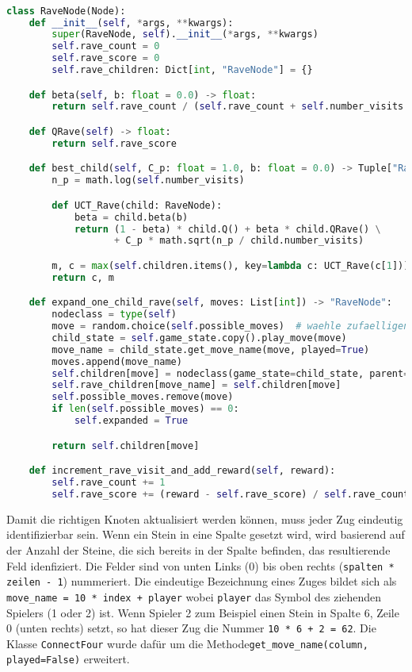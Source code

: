 \begin{lstlisting}[language=Python,label={lst:rave-node}]

class RaveNode(Node):
    def __init__(self, *args, **kwargs):
        super(RaveNode, self).__init__(*args, **kwargs)
        self.rave_count = 0
        self.rave_score = 0
        self.rave_children: Dict[int, "RaveNode"] = {}

    def beta(self, b: float = 0.0) -> float:
        return self.rave_count / (self.rave_count + self.number_visits + self.rave_count * self.number_visits * b * b)

    def QRave(self) -> float:
        return self.rave_score

    def best_child(self, C_p: float = 1.0, b: float = 0.0) -> Tuple["RaveNode", int]:
        n_p = math.log(self.number_visits)

        def UCT_Rave(child: RaveNode):
            beta = child.beta(b)
            return (1 - beta) * child.Q() + beta * child.QRave() \
                   + C_p * math.sqrt(n_p / child.number_visits)

        m, c = max(self.children.items(), key=lambda c: UCT_Rave(c[1]))
        return c, m

    def expand_one_child_rave(self, moves: List[int]) -> "RaveNode":
        nodeclass = type(self)
        move = random.choice(self.possible_moves)  # waehle zufaelligen Zug
        child_state = self.game_state.copy().play_move(move)
        move_name = child_state.get_move_name(move, played=True)
        moves.append(move_name)
        self.children[move] = nodeclass(game_state=child_state, parent=self)
        self.rave_children[move_name] = self.children[move]
        self.possible_moves.remove(move)
        if len(self.possible_moves) == 0:
            self.expanded = True

        return self.children[move]

    def increment_rave_visit_and_add_reward(self, reward):
        self.rave_count += 1
        self.rave_score += (reward - self.rave_score) / self.rave_count
\end{lstlisting}

Damit die richtigen Knoten aktualisiert werden können, muss jeder Zug eindeutig identifizierbar sein.
Wenn ein Stein in eine Spalte gesetzt wird, wird basierend auf der Anzahl der Steine, die sich bereits in der Spalte befinden, das resultierende Feld idenfiziert.
Die Felder sind von unten Links (0) bis oben rechts (\verb|spalten * zeilen - 1|) nummeriert.
Die eindeutige Bezeichnung eines Zuges bildet sich als \verb|move_name = 10 * index + player| wobei \verb|player| das Symbol des ziehenden Spielers (1 oder 2) ist.
Wenn Spieler 2 zum Beispiel einen Stein in Spalte 6, Zeile 0 (unten rechts) setzt, so hat dieser Zug die Nummer \verb|10 * 6 + 2 = 62|.
Die Klasse \verb|ConnectFour| wurde dafür um die Methode\linebreak[2] \texttt{get\_move\_name(column, played=False)} erweitert.

